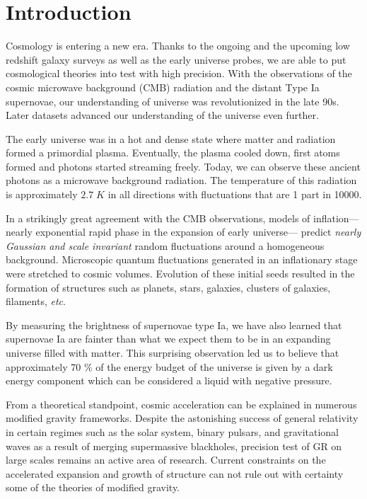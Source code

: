 \chapter*{Introduction}

Cosmology is entering a new era. Thanks to the ongoing and 
the upcoming low redshift galaxy surveys as well as the early universe probes, 
we are able to put cosmological theories into test with high precision.
With the observations of the cosmic microwave background (CMB) radiation 
and the distant Type Ia supernovae, our understanding of universe was 
revolutionized in the late 90s. Later datasets advanced our understanding 
of the universe even further.

The early universe was in a hot and dense state where 
matter and radiation formed a primordial plasma. Eventually, the 
plasma cooled down, first atoms formed and photons started streaming freely.  
Today, we can observe these ancient photons as a microwave background radiation. 
The temperature of this radiation is approximately $2.7 \; K$ in all directions with 
fluctuations that are 1 part in 10000.

In a strikingly great agreement with the CMB observations, models of inflation---nearly 
exponential rapid phase in the expansion of early universe--- 
predict \emph{nearly Gaussian and scale invariant} random fluctuations around a homogeneous 
background. Microscopic quantum fluctuations generated in an inflationary 
stage were stretched to cosmic volumes. Evolution of these initial seeds 
resulted in the formation of structures such as planets, stars, galaxies, 
clusters of galaxies, filaments, \emph{etc}.

By measuring the brightness of supernovae type Ia, we have also learned 
that supernovae Ia are fainter than what we expect them to be in an 
expanding universe filled with matter. This surprising observation led us to 
believe that approximately 70 $\%$ of the energy budget of the universe is 
given by a dark energy component which can be considered a liquid with 
negative pressure.

From a theoretical standpoint, cosmic acceleration 
can be explained in numerous modified gravity frameworks. 
Despite the astonishing success of general relativity in 
certain regimes such as the solar system, binary pulsars, 
and gravitational waves as a result of merging supermassive blackholes, 
precision test of GR on large scales remains an active area of research. 
Current constraints on the accelerated expansion and growth of structure 
can not rule out with certainty some of the theories of modified gravity.

